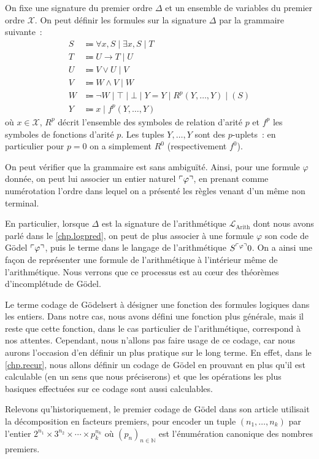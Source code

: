 \begin{example}
  On fixe une signature du premier ordre $\Delta$ et un ensemble de variables
  du premier ordre $\mathcal X$. On peut définir les formules sur la signature
  $\Delta$ par la grammaire suivante~:
  \begin{align*}
    S &\Coloneq \forall x, S \mid \exists x, S\mid T\\
    T &\Coloneq U \to T \mid U\\
    U &\Coloneq V \lor U \mid V\\
    V &\Coloneq W \land V \mid W\\
    W &\Coloneq \lnot W \mid \top \mid \bot \mid Y = Y \mid
    R^p(Y,\ldots,Y)\mid (S)\\
    Y &\Coloneq x \mid f^p(Y,\ldots,Y)
  \end{align*}
  où $x \in \mathcal X$, $R^p$ décrit l'ensemble des symboles de relation
  d'arité $p$ et $f^p$ les symboles de fonctions d'arité $p$. Les tuples
  $Y,\ldots,Y$ sont des $p$-uplets~: en particulier pour $p = 0$ on a simplement
  $R^0$ (respectivement $f^0$).
  
  On peut vérifier que la grammaire est sans ambiguïté. Ainsi, pour une formule
  $\varphi$ donnée, on peut lui associer un entier naturel $\ulcorner\varphi\urcorner$, en
  prenant comme numérotation l'ordre dans lequel on a présenté les règles venant
  d'un même non terminal.

  En particulier, lorsque $\Delta$ est la signature de l'arithmétique
  $\mathcal L_{\mathrm{Arith}}$ dont nous avons parlé dans le
  \cref{chp.logpred}, on peut de plus associer à une formule $\varphi$ son
  code de Gödel $\ulcorner\varphi\urcorner$, puis le terme dans le langage de
  l'arithmétique $S^{\ulcorner\varphi\urcorner}0$. On a ainsi une façon de représenter une
  formule de l'arithmétique à l'intérieur même de l'arithmétique. Nous verrons
  que ce processus est au c\oe ur des théorèmes d'incomplétude de Gödel.
\end{example}

\begin{remark}
  Le terme \og codage de Gödel\fg sert à désigner une fonction des formules
  logiques dans les entiers. Dans notre cas, nous avons défini une fonction plus
  générale, mais il reste que cette fonction, dans le cas particulier de
  l'arithmétique, correspond à nos attentes. Cependant, nous n'allons pas
  faire usage de ce codage, car nous aurons l'occasion d'en définir un plus
  pratique sur le long terme. En effet, dans le \cref{chp.recur}, nous allons
  définir un codage de Gödel en prouvant en plus qu'il est calculable (en un
  sens que nous préciserons) et que les opérations les plus basiques effectuées
  sur ce codage sont aussi calculables.

  Relevons qu'historiquement, le premier codage de Gödel dans son article
  \cite{Godel1931-GDEBFU} utilisait la décomposition en facteurs premiers, pour
  encoder un tuple $(n_1,\ldots,n_k)$ par l'entier
  $2^{n_1}\times 3^{n_2}\times\cdots \times p_k^{n_k}$ où $(p_n)_{n \in \mathbb N}$
  est l'énumération canonique des nombres premiers.
\end{remark}
  
